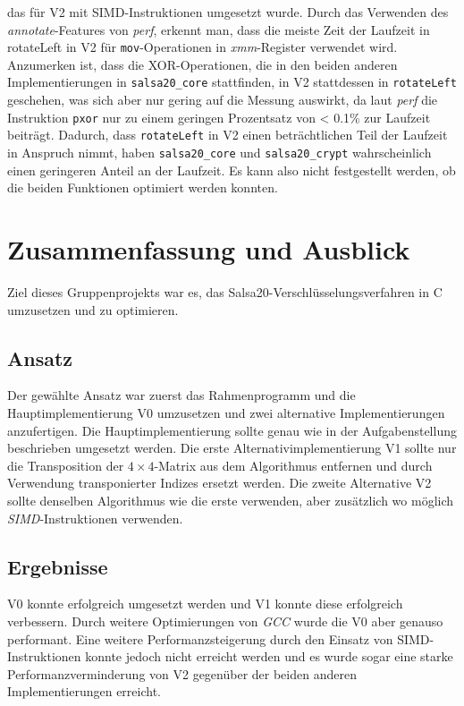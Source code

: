 \documentclass[course=erap]{aspdoc}
\begin{document}
das für V2 mit SIMD-Instruktionen umgesetzt wurde. Durch das Verwenden des \emph{annotate}-Features von 
\emph{perf}, erkennt man, dass die meiste Zeit der Laufzeit in rotateLeft in V2 für \texttt{mov}-Operationen in 
\emph{xmm}-Register verwendet wird. Anzumerken ist, dass die XOR-Operationen, die in den beiden anderen Implementierungen
in \texttt{salsa20\_core} stattfinden, in V2 stattdessen in \texttt{rotateLeft} geschehen, was sich aber nur gering 
auf die Messung auswirkt, da laut \emph{perf} die Instruktion \texttt{pxor} nur zu einem geringen 
Prozentsatz von < 0.1\% zur Laufzeit beiträgt.
Dadurch, dass \texttt{rotateLeft} in V2 einen beträchtlichen Teil der Laufzeit in Anspruch nimmt,
haben \texttt{salsa20\_core} und \texttt{salsa20\_crypt} wahrscheinlich einen geringeren Anteil an der Laufzeit. Es kann 
also nicht festgestellt werden, ob die beiden Funktionen optimiert werden konnten.


\section{Zusammenfassung und Ausblick}
Ziel dieses Gruppenprojekts war es, das Salsa20-Verschlüsselungsverfahren in C umzusetzen und zu optimieren.

\subsection{Ansatz}
Der gewählte Ansatz war zuerst das Rahmenprogramm und die Hauptimplementierung V0 umzusetzen 
und zwei alternative Implementierungen anzufertigen. Die Hauptimplementierung sollte genau wie 
in der Aufgabenstellung beschrieben umgesetzt werden.
Die erste Alternativimplementierung V1 sollte nur die Transposition der $4\times 4$-Matrix aus 
dem Algorithmus entfernen und durch Verwendung transponierter Indizes ersetzt werden. Die zweite Alternative V2
sollte denselben Algorithmus wie die erste verwenden, aber zusätzlich wo möglich \emph{SIMD}-Instruktionen verwenden.

\subsection{Ergebnisse}
V0 konnte erfolgreich umgesetzt werden und V1 konnte 
diese erfolgreich verbessern. Durch weitere Optimierungen von \emph{GCC} wurde die V0 aber
genauso performant.
Eine weitere Performanzsteigerung durch den Einsatz von SIMD-Instruktionen konnte jedoch nicht erreicht werden
und es wurde sogar eine starke Performanzverminderung von V2 gegenüber der beiden anderen Implementierungen erreicht.
\end{document}
